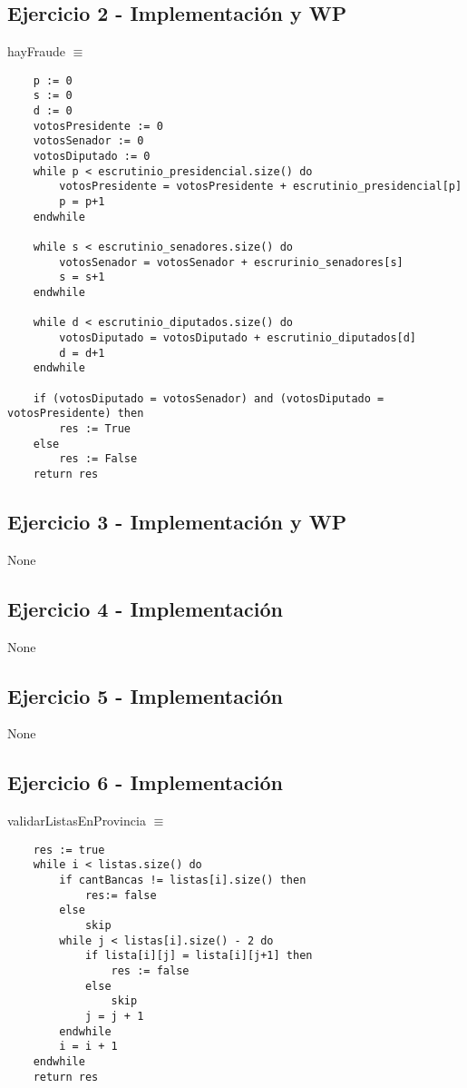 \documentclass[10pt,a4paper]{article}
\begin{document}
\subsection{Ejercicio 2 - Implementación y WP}
\begin{minipage}[t]{\textwidth}
	hayFraude \(\equiv\) \begin{lstlisting}
	p := 0
	s := 0
	d := 0
	votosPresidente := 0
	votosSenador := 0
	votosDiputado := 0
	while p < escrutinio_presidencial.size() do
		votosPresidente = votosPresidente + escrutinio_presidencial[p]
		p = p+1
	endwhile	
	
	while s < escrutinio_senadores.size() do
		votosSenador = votosSenador + escrurinio_senadores[s]
		s = s+1
	endwhile	
	
	while d < escrutinio_diputados.size() do
		votosDiputado = votosDiputado + escrutinio_diputados[d]
		d = d+1
	endwhile
		
	if (votosDiputado = votosSenador) and (votosDiputado = votosPresidente) then
		res := True
	else
		res := False
	return res
	\end{lstlisting}
\end{minipage}		
\subsection{Ejercicio 3 - Implementación y WP}
None
\subsection{Ejercicio 4 - Implementación}
None
\subsection{Ejercicio 5 - Implementación}
None
\subsection{Ejercicio 6 - Implementación}
\begin{minipage}[t]{\textwidth}
	validarListasEnProvincia \(\equiv\) \begin{lstlisting}
	res := true
	while i < listas.size() do
		if cantBancas != listas[i].size() then
			res:= false
		else
			skip
		while j < listas[i].size() - 2 do
			if lista[i][j] = lista[i][j+1] then
				res := false
			else
				skip
			j = j + 1
		endwhile
		i = i + 1
	endwhile
	return res
	\end{lstlisting}
\end{minipage}	
\end{document}
